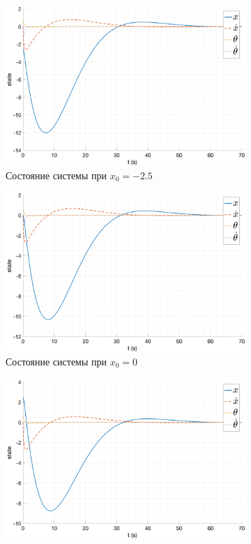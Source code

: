\begin{figure}[ht!]
    \centering
    \begin{subfigure}[b]{0.45\textwidth}
        \centering
        \includegraphics[width=\textwidth]{media/plots/LQR/state_6.png}
        \caption{Состояние системы при $x_0 = -2.5$}
    \end{subfigure}
    \begin{subfigure}[b]{0.45\textwidth}        
        \centering
        \includegraphics[width=\textwidth]{media/plots/LQR/state_7.png}
        \caption{Состояние системы при $x_0 = 0$}
    \end{subfigure}
    \begin{subfigure}[b]{0.45\textwidth}    
        \centering
        \includegraphics[width=\textwidth]{media/plots/LQR/state_8.png}

\end{subfigure}
\end{figure}
